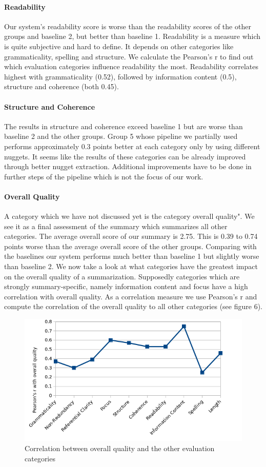\paragraph{Readability}
Our system's readability score is worse than the readability scores of the other groups and baseline 2, but better than baseline 1. Readability is a measure which is quite subjective and hard to define. It depends on other categories like grammaticality, spelling and structure. We calculate the Pearson's r to find out which evaluation categories influence readability the most. Readability correlates highest with grammaticality (0.52), followed by information content (0.5), structure and coherence (both 0.45).   

\paragraph{Structure and Coherence}
The results in structure and coherence exceed baseline 1 but are worse than baseline 2 and the other groups. Group 5 whose pipeline we partially used performs approximately 0.3 points better at each category only by using different nuggets. It seems like the results of these categories can be already improved through better nugget extraction. Additional improvements have to be done in further steps of the pipeline which is not the focus of our work.

\paragraph{Overall Quality}
A category which we have not discussed yet is the category overall quality". We see it as a final assessment of the summary which summarizes all other categories. The average overall score of our summary is 2.75. This is 0.39 to 0.74 points worse than the average overall score of the other groups. Comparing with the baselines our system performs much better than baseline 1 but slightly worse than baseline 2. We now take a look at what categories have the greatest impact on the overall quality of a summarization. Supposedly categories which are strongly summary-specific, namely information content and focus have a high correlation with overall quality. As a correlation measure we use Pearson's r and compute the correlation of the overall quality to all other categories (see figure 6).
\begin{figure}[!ht]
	\centering
	\label{fig:corr_overall_quality}
	\caption{Correlation between overall quality and the other evaluation categories}
	\includegraphics[width=0.8\linewidth]{figures/correlation_overall_quality.png}
\end{figure}


